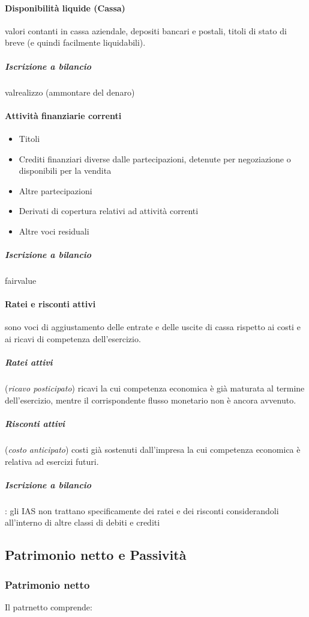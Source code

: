 \documentclass[10pt,a4paper,fleqn,oneside]{book}
\begin{document}
\paragraph{Disponibilità liquide (Cassa)} valori contanti in cassa aziendale,
depositi bancari e postali, titoli di stato di breve (e quindi facilmente liquidabili).
\subparagraph{Iscrizione a bilancio} \gls{valrealizzo} (ammontare del denaro)

\paragraph{Attività finanziarie correnti}
\begin{itemize}
    \item Titoli
    \item Crediti finanziari 
    diverse dalle partecipazioni, detenute per negoziazione o disponibili per la vendita
    \item Altre partecipazioni
    \item Derivati di copertura relativi ad attività correnti
    \item Altre voci residuali
\end{itemize}
\subparagraph{Iscrizione a bilancio} \gls{fairvalue}

\paragraph{Ratei e risconti attivi} sono voci di aggiustamento delle entrate e
delle uscite di cassa rispetto ai costi e ai ricavi di competenza dell’esercizio.

\subparagraph{Ratei attivi} (\emph{ricavo posticipato}) ricavi la cui competenza economica è già maturata al 
termine dell’esercizio, mentre il corrispondente flusso monetario non è ancora avvenuto.
\subparagraph{Risconti attivi} (\emph{costo anticipato}) costi già sostenuti dall’impresa la cui competenza
economica è relativa ad esercizi futuri.
\subparagraph{Iscrizione a bilancio}: gli IAS non trattano specificamente dei
ratei e dei risconti considerandoli all'interno di altre classi di debiti e crediti

\subsection{Patrimonio netto e Passività}

\subsubsection{Patrimonio netto}
Il \gls{patrnetto} comprende:
\end{document}
